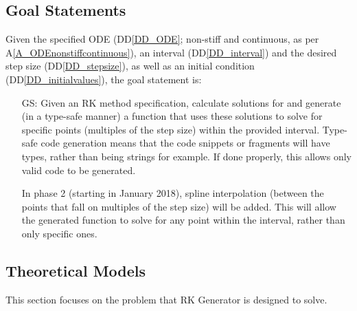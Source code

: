 \documentclass[12pt]{article}
\newcommand{\ddref}[1]{DD\ref{#1}}
\newcommand{\aref}[1]{A\ref{#1}}
\newcounter{goalnum} %
\newcommand{\famname}{RK Generator} %
\begin{document}
\subsection{Goal Statements}

\noindent Given the specified ODE (\ddref{DD_ODE}; non-stiff and continuous, as 
per 
\aref{A_ODEnonstiffcontinuous}), an interval (\ddref{DD_interval}) and the 
desired step 
size (\ddref{DD_stepsize}), as well as 
an initial condition (\ddref{DD_initialvalues}), the goal statement is:

\begin{itemize}

\item[GS\refstepcounter{goalnum}\thegoalnum \label{G_meaningfulLabel}:] Given 
an RK method specification, calculate solutions for and generate (in a 
type-safe manner) a 
function that uses these solutions to solve for specific points (multiples of 
the step size) within the provided 
interval.
Type-safe code generation means that the code snippets or fragments will have 
types, rather than being strings for example. If done properly, this allows 
only valid code to be generated.

In phase 2 (starting in January 2018), spline interpolation (between the points 
that fall on multiples of the step size) will be added. This 
will allow the generated function to solve for any point within the interval, 
rather than only specific ones.
\end{itemize}


\subsection{Theoretical Models} \label{sec_theoretical}

This section focuses on the problem that \famname{} is designed to solve.

~\newline
\end{document}
